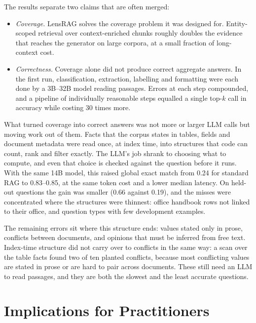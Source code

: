 \documentclass[11pt,letterpaper,oneside]{report}
\begin{document}
The results separate two claims that are often merged:
\begin{itemize}
  \item \emph{Coverage.} LensRAG solves the coverage problem it was designed
  for. Entity-scoped retrieval over context-enriched chunks roughly doubles
  the evidence that reaches the generator on large corpora, at a small
  fraction of long-context cost.
  \item \emph{Correctness.} Coverage alone did not produce correct aggregate
  answers. In the first run, classification, extraction, labelling and
  formatting were each done by a 3B--32B model reading passages. Errors at
  each step compounded, and a pipeline of individually reasonable steps
  equalled a single top-$k$ call in accuracy while costing 30 times more.
\end{itemize}
What turned coverage into correct answers was not more or larger LLM calls
but moving work out of them. Facts that the corpus states in tables, fields
and document metadata were read once, at index time, into structures that
code can count, rank and filter exactly. The LLM's job shrank to choosing
what to compute, and even that choice is checked against the question before
it runs. With the same 14B model, this raised global exact match from 0.24
for standard RAG to 0.83--0.85, at the same token cost and a lower median
latency. On held-out questions the gain was smaller (0.66 against 0.19), and
the misses were concentrated where the structures were thinnest: office
handbook rows not linked to their office, and question types with few
development examples.

The remaining errors sit where this structure ends: values stated only in
prose, conflicts between documents, and opinions that must be inferred from
free text. Index-time structure did not carry over to conflicts in the same
way: a scan over the table facts found two of ten planted conflicts, because
most conflicting values are stated in prose or are hard to pair across
documents. These still need an LLM to read passages, and they are both the
slowest and the least accurate questions.

\section{Implications for Practitioners}
\label{sec:practice}
\end{document}
